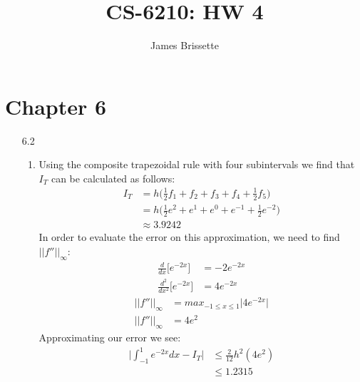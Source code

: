 \documentclass[11pt,a4paper]{article}
\author{James Brissette}
\title{CS-6210: HW 4}
\begin{document}
	\maketitle
	
	\section{Chapter 6}
		\begin{itemize}
			\item[6.2]
				\begin{enumerate} [label={\alph*)}]
					\item Using the composite trapezoidal rule with four subintervals we find that $I_T$ can be calculated as follows:
					\begin{align*}
						I_T &= h\Big( \frac{1}{2}f_1 + f_2 + f_3 + f_4 + \frac{1}{2}f_5 \Big) \\
						    &= h\Big( \frac{1}{2}e^2 + e^1 + e^0 + e^{-1} + \frac{1}{2}e^{-2} \Big) \\
						    &\approx 3.9242
					\end{align*}
					In order to evaluate the error on this approximation, we need to find $\vert \vert f'' \vert \vert_\infty$:
					\begin{align*}
					\frac{d}{dx}\Big[e^{-2x}\Big]      &= -2e^{-2x} \\
					\frac{d^2}{dx^2}\Big[e^{-2x}\Big]  &= 4e^{-2x}
					\end{align*}
					\begin{align*}
					\vert \vert f'' \vert \vert_\infty &= max_{-1\leq x\leq 1} \vert 4e^{-2x} \vert\\
					\vert \vert f'' \vert \vert_\infty &= 4e^2
					\end{align*}
					Approximating our error we see:
					\begin{align*}
					\Biggl \vert \int_{-1}^{1}e^{-2x}dx - I_T \Biggl\vert &\leq \frac{2}{12}h^2 (4e^2) \\
					&\leq 1.2315
					\end{align*}
					

\end{enumerate}
\end{itemize}
\end{document}
